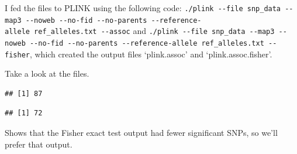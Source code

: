 \documentclass[]{article}
\newenvironment{Shaded}{\begin{snugshade}}{\end{snugshade}}
\newcommand{\KeywordTok}[1]{\textcolor[rgb]{0.13,0.29,0.53}{\textbf{#1}}}
\newcommand{\DataTypeTok}[1]{\textcolor[rgb]{0.13,0.29,0.53}{#1}}
\newcommand{\FloatTok}[1]{\textcolor[rgb]{0.00,0.00,0.81}{#1}}
\newcommand{\StringTok}[1]{\textcolor[rgb]{0.31,0.60,0.02}{#1}}
\newcommand{\CommentTok}[1]{\textcolor[rgb]{0.56,0.35,0.01}{\textit{#1}}}
\newcommand{\OtherTok}[1]{\textcolor[rgb]{0.56,0.35,0.01}{#1}}
\newcommand{\OperatorTok}[1]{\textcolor[rgb]{0.81,0.36,0.00}{\textbf{#1}}}
\newcommand{\NormalTok}[1]{#1}
\begin{document}
I fed the files to PLINK using the following code:
\texttt{./plink\ -\/-file\ snp\_data\ -\/-map3\ -\/-noweb\ -\/-no-fid\ -\/-no-parents\ -\/-reference-allele\ ref\_alleles.txt\ -\/-assoc}
and
\texttt{./plink\ -\/-file\ snp\_data\ -\/-map3\ -\/-noweb\ -\/-no-fid\ -\/-no-parents\ -\/-reference-allele\ ref\_alleles.txt\ -\/-fisher},
which created the output files `plink.assoc' and `plink.assoc.fisher'.

Take a look at the files.

\begin{Shaded}
\end{Shaded}

\begin{verbatim}
## [1] 87
\end{verbatim}

\begin{Shaded}
\end{Shaded}

\begin{verbatim}
## [1] 72
\end{verbatim}

Shows that the Fisher exact test output had fewer significant SNPs, so
we'll prefer that output.

\begin{Shaded}
\end{Shaded}
\end{document}
